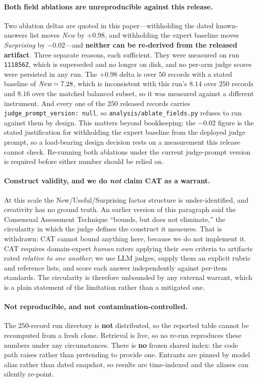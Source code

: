 \paragraph{Both field ablations are unreproducible against this release.} Two ablation deltas are
quoted in this paper---withholding the dated known-answers list moves \emph{New} by $+0.98$, and
withholding the expert baseline moves \emph{Surprising} by $-0.02$---and \textbf{neither can be
re-derived from the released artifact}. Three separate reasons, each sufficient. They were measured on
run \texttt{111856Z}, which is superseded and no longer on disk, and no per-arm judge scores were
persisted in any run. The $+0.98$ delta is over $50$ records with a stated baseline of $\emph{New} =
7.28$, which is inconsistent with this run's $8.14$ over $250$ records and $8.16$ over the matched
balanced subset, so it was measured against a different instrument. And every one of the $250$ released
records carries \texttt{judge\_prompt\_version: null}, so \texttt{analysis/ablate\_fields.py} refuses
to run against them by design. This matters beyond bookkeeping: the $-0.02$ figure is the stated
justification for withholding the expert baseline from the deployed judge prompt, so a load-bearing
design decision rests on a measurement this release cannot check. Re-running both ablations under the
current judge-prompt version is required before either number should be relied on.

\paragraph{Construct validity, and we do \emph{not} claim CAT as a warrant.} At this scale the
New/Useful/Surprising factor structure is under-identified, and creativity has no ground truth. An
earlier version of this paragraph said the Consensual Assessment Technique ``bounds, but does not
eliminate,'' the circularity in which the judge defines the construct it measures. That is
withdrawn: CAT cannot bound anything here, because we do not implement it. CAT requires
domain-expert \emph{human} raters applying their \emph{own} criteria to artifacts rated
\emph{relative to one another}; we use LLM judges, supply them an explicit rubric and reference
lists, and score each answer independently against per-item standards. The circularity is therefore
unbounded by any external warrant, which is a plain statement of the limitation rather than a
mitigated one.

\paragraph{Not reproducible, and not contamination-controlled.} The $250$-record run directory is
\textbf{not} distributed, so the reported table cannot be recomputed from a fresh clone. Retrieval
is live, so no re-run reproduces these numbers under any circumstances. There is \textbf{no} frozen
shared index: the code path raises rather than pretending to provide one. Entrants are pinned by
model alias rather than dated snapshot, so results are time-indexed and the aliases can silently
re-point.

